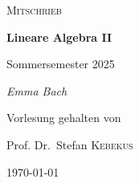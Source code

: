 \begin{titlepage}
	\centering
	{\Large \textsc{Mitschrieb}\par}
	\vspace{0.5cm}
	{\huge\bfseries Lineare Algebra II\par}
	\vspace{1cm}
    {\Large Sommersemester 2025\par}
    \vspace{1cm}
	{\Large\itshape Emma Bach\par}
	\vfill
	Vorlesung gehalten von\par
	Prof. Dr.~Stefan \textsc{Kebekus}

	\vfill

	{\large \today\par}
\end{titlepage}
